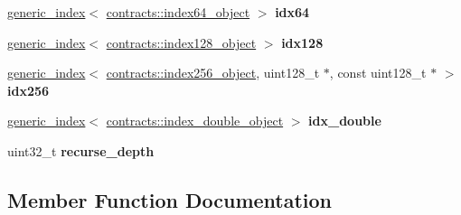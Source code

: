 \begin{DoxyCompactItemize}
\item 
\mbox{\label{classaacio_1_1chain_1_1apply__context_a41d17f912b0dd77072fcfa25dc028229}} 
\mbox{\hyperlink{classaacio_1_1chain_1_1apply__context_1_1generic__index}{generic\+\_\+index}}$<$ \mbox{\hyperlink{structaacio_1_1chain_1_1contracts_1_1secondary__index_1_1index__object}{contracts\+::index64\+\_\+object}} $>$ {\bfseries idx64}
\item 
\mbox{\label{classaacio_1_1chain_1_1apply__context_a0699edfef4a541ebca60739ce00c1362}} 
\mbox{\hyperlink{classaacio_1_1chain_1_1apply__context_1_1generic__index}{generic\+\_\+index}}$<$ \mbox{\hyperlink{structaacio_1_1chain_1_1contracts_1_1secondary__index_1_1index__object}{contracts\+::index128\+\_\+object}} $>$ {\bfseries idx128}
\item 
\mbox{\label{classaacio_1_1chain_1_1apply__context_ae3d3e8445d1e2586179bd180437d5011}} 
\mbox{\hyperlink{classaacio_1_1chain_1_1apply__context_1_1generic__index}{generic\+\_\+index}}$<$ \mbox{\hyperlink{structaacio_1_1chain_1_1contracts_1_1secondary__index_1_1index__object}{contracts\+::index256\+\_\+object}}, uint128\+\_\+t $\ast$, const uint128\+\_\+t $\ast$ $>$ {\bfseries idx256}
\item 
\mbox{\label{classaacio_1_1chain_1_1apply__context_aee2ad82b0aa93d05646c38581e1002fe}} 
\mbox{\hyperlink{classaacio_1_1chain_1_1apply__context_1_1generic__index}{generic\+\_\+index}}$<$ \mbox{\hyperlink{contract__table__objects_8hpp_a39dd0e3528464bbc3e1688edd03cdae6}{contracts\+::index\+\_\+double\+\_\+object}} $>$ {\bfseries idx\+\_\+double}
\item 
\mbox{\label{classaacio_1_1chain_1_1apply__context_a573be9d2e00d51246b56ecff9ea3830e}} 
uint32\+\_\+t {\bfseries recurse\+\_\+depth}
\end{DoxyCompactItemize}


\subsection{Member Function Documentation}
\mbox{\label{classaacio_1_1chain_1_1apply__context_a22d5637eb5acab5710dedd675b066984}} 
